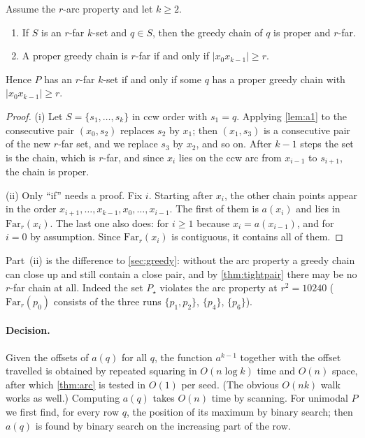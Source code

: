 \begin{theorem}\label{thm:arc}
Assume the $r$-arc property and let $k\ge2$.
\begin{enumerate}[label=(\roman*),itemsep=1pt,topsep=2pt]
\item If $S$ is an $r$-far $k$-set and $q\in S$, then the greedy chain of $q$
is proper and $r$-far.
\item A proper greedy chain is $r$-far if and only if $|x_0x_{k-1}|\ge r$.
\end{enumerate}
Hence $P$ has an $r$-far $k$-set if and only if some $q$ has a proper greedy
chain with $|x_0x_{k-1}|\ge r$.
\end{theorem}
\begin{proof}
(i) Let $S=\{s_1,\dots,s_k\}$ in ccw order with $s_1=q$. Applying
\cref{lem:a1} to the consecutive pair $(x_0,s_2)$ replaces $s_2$ by $x_1$;
then $(x_1,s_3)$ is a consecutive pair of the new $r$-far set, and we replace
$s_3$ by $x_2$, and so on. After $k-1$ steps the set is the chain, which is
$r$-far, and since $x_i$ lies on the ccw arc from $x_{i-1}$ to $s_{i+1}$, the
chain is proper.

(ii) Only ``if'' needs a proof. Fix $i$. Starting after $x_i$, the other
chain points appear in the order
$x_{i+1},\dots,x_{k-1},x_0,\dots,x_{i-1}$. The first of them is $a(x_i)$ and
lies in $\mathrm{Far}_r(x_i)$. The last one also does: for $i\ge1$ because
$x_i=a(x_{i-1})$, and for $i=0$ by assumption. Since $\mathrm{Far}_r(x_i)$ is
contiguous, it contains all of them.
\end{proof}

Part~(ii) is the difference to \cref{sec:greedy}: without the arc property a
greedy chain can close up and still contain a close pair, and by
\cref{thm:tightpair} there may be no $r$-far chain at all. Indeed the set
$P_\star$ violates the arc property at $r^2=10240$ ($\mathrm{Far}_r(p_0)$
consists of the three runs $\{p_1,p_2\}$, $\{p_4\}$, $\{p_6\}$).

\paragraph{Decision.}
Given the offsets of $a(q)$ for all $q$, the function $a^{k-1}$ together with
the offset travelled is obtained by repeated squaring in $O(n\log k)$ time and
$O(n)$ space, after which \cref{thm:arc} is tested in $O(1)$ per seed. (The
obvious $O(nk)$ walk works as well.) Computing $a(q)$ takes $O(n)$ time by
scanning. For unimodal $P$ we first find, for every row $q$, the position of
its maximum by binary search; then $a(q)$ is found by binary search on the
increasing part of the row.


